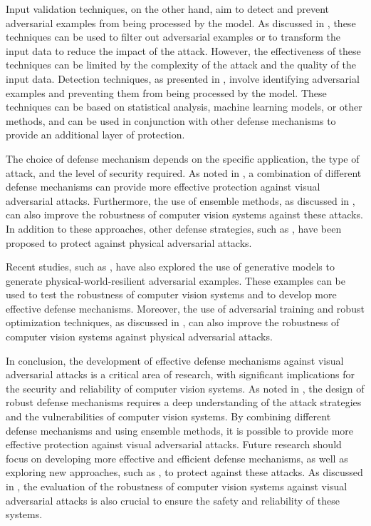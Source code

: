 \documentclass[11pt,a4paper]{article}
\begin{document}
Input validation techniques, on the other hand, aim to detect and prevent adversarial examples from being processed by the model. As discussed in \cite{doi:10.1109/asp-dac47756.2020.9045584}, these techniques can be used to filter out adversarial examples or to transform the input data to reduce the impact of the attack. However, the effectiveness of these techniques can be limited by the complexity of the attack and the quality of the input data. Detection techniques, as presented in \cite{arxiv:1906.11897}, involve identifying adversarial examples and preventing them from being processed by the model. These techniques can be based on statistical analysis, machine learning models, or other methods, and can be used in conjunction with other defense mechanisms to provide an additional layer of protection.

The choice of defense mechanism depends on the specific application, the type of attack, and the level of security required. As noted in \cite{doi:10.1109/iros51168.2021.9636638}, a combination of different defense mechanisms can provide more effective protection against visual adversarial attacks. Furthermore, the use of ensemble methods, as discussed in \cite{arxiv:1810.00069}, can also improve the robustness of computer vision systems against these attacks. In addition to these approaches, other defense strategies, such as \cite{doi:10.1145/3433210.3437513}, have been proposed to protect against physical adversarial attacks.

Recent studies, such as \cite{doi:10.1109/cvpr42600.2020.01426}, have also explored the use of generative models to generate physical-world-resilient adversarial examples. These examples can be used to test the robustness of computer vision systems and to develop more effective defense mechanisms. Moreover, the use of adversarial training and robust optimization techniques, as discussed in \cite{arxiv:1707.08945}, can also improve the robustness of computer vision systems against physical adversarial attacks.

In conclusion, the development of effective defense mechanisms against visual adversarial attacks is a critical area of research, with significant implications for the security and reliability of computer vision systems. As noted in \cite{doi:10.1145/3459637.3482029}, the design of robust defense mechanisms requires a deep understanding of the attack strategies and the vulnerabilities of computer vision systems. By combining different defense mechanisms and using ensemble methods, it is possible to provide more effective protection against visual adversarial attacks. Future research should focus on developing more effective and efficient defense mechanisms, as well as exploring new approaches, such as \cite{doi:10.1145/3433210.3437513}, to protect against these attacks. As discussed in \cite{doi:10.1109/jiot.2021.3099164}, the evaluation of the robustness of computer vision systems against visual adversarial attacks is also crucial to ensure the safety and reliability of these systems.
\end{document}
